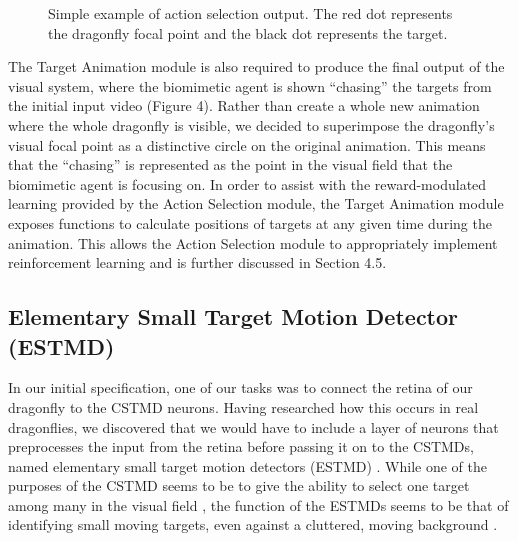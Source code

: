 \documentclass[a4paper,11pt]{article}
\begin{document}
\begin{figure}[H]
\begin{minipage}{0.23\textwidth}
\end{minipage}
\begin{minipage}{0.23\textwidth}
\end{minipage}
\caption{Simple example of action selection output. The red dot represents the dragonfly focal point and the black dot represents the target.}
\end{figure}

The Target Animation module is also required to produce the final output of the visual system, where the biomimetic agent is shown ``chasing'' the targets from the initial input video (Figure 4). Rather than create a whole new animation where the whole dragonfly is visible, we decided to superimpose the dragonfly's visual focal point as a distinctive circle on the original animation. This means that the ``chasing'' is represented as the point in the visual field that the biomimetic agent is focusing on. In order to assist with the reward-modulated learning provided by the Action Selection module, the Target Animation module exposes functions to calculate positions of targets at any given time during the animation. This allows the Action Selection module to appropriately implement reinforcement learning and is further discussed in Section 4.5.

\subsection{Elementary Small Target Motion Detector (ESTMD)}

In our initial specification, one of our tasks was to connect the retina of our dragonfly to the CSTMD neurons. Having researched how this occurs in real dragonflies, we discovered that we would have to include a layer of neurons that preprocesses the input from the retina before passing it on to the CSTMDs, named elementary small target motion detectors (ESTMD) \cite{Wiederman2008}. While one of the purposes of the CSTMD seems to be to give the ability to select one target among many in the visual field \cite{w13}, the function of the ESTMDs seems to be that of identifying small moving targets, even against a cluttered, moving background \cite{Wiederman2008}.
\end{document}
